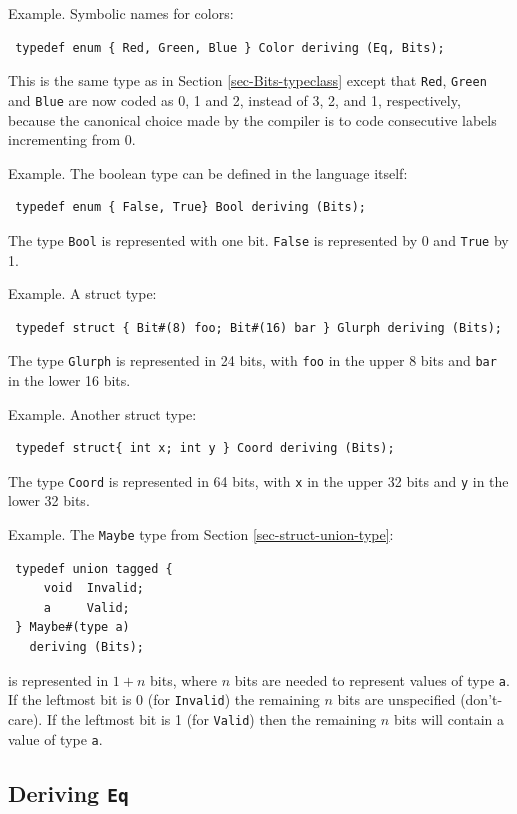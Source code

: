 \documentclass[twoside,letterpaper]{article}
\begin{document}
Example. Symbolic names for colors:
\begin{verbatim}
 typedef enum { Red, Green, Blue } Color deriving (Eq, Bits);
\end{verbatim}
This is the same type as in Section {\ref{sec-Bits-typeclass}} except
that \texttt{Red}, \texttt{Green} and \texttt{Blue} are now coded as 0, 1 and
2, instead of 3, 2, and 1, respectively, because the canonical choice
made by the compiler is to code consecutive labels incrementing from
0.

Example.  The boolean type can be defined in the language itself:
\begin{verbatim}
 typedef enum { False, True} Bool deriving (Bits);
\end{verbatim}
The type \texttt{Bool} is represented with one bit.  \texttt{False} is
represented by 0 and \texttt{True} by 1.

Example.  A struct type:
\begin{verbatim}
 typedef struct { Bit#(8) foo; Bit#(16) bar } Glurph deriving (Bits);
\end{verbatim}
The type \texttt{Glurph} is represented in 24 bits, with \texttt{foo} in the
upper 8 bits and \texttt{bar} in the lower 16 bits.

Example.  Another struct type:
\begin{verbatim}
 typedef struct{ int x; int y } Coord deriving (Bits);
\end{verbatim}
The type \texttt{Coord} is represented in 64 bits, with \texttt{x} in the
upper 32 bits and \texttt{y} in the lower 32 bits.

Example.  The \texttt{Maybe} type from Section \ref{sec-struct-union-type}:
\begin{verbatim}
 typedef union tagged {
     void  Invalid;
     a     Valid;
 } Maybe#(type a)
   deriving (Bits);
\end{verbatim}
is represented in $1+n$ bits, where $n$ bits are needed to represent
values of type \texttt{a}.  If the leftmost bit is 0 (for \texttt{Invalid})
the remaining $n$ bits are unspecified (don't-care).  If the leftmost
bit is 1 (for \texttt{Valid}) then the remaining $n$ bits will contain a
value of type \texttt{a}.


\subsection{Deriving \texttt{Eq}}
\end{document}
